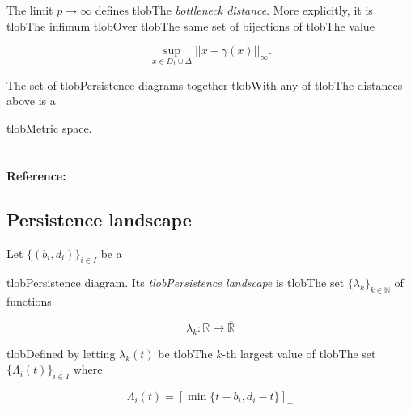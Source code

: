 \documentclass{amsart}
\begin{document}
	The limit $p \to \infty$ defines tlobThe \textit{bottleneck distance}. More explicitly, it is tlobThe infimum tlobOver tlobThe same set of bijections of tlobThe value

	\begin{equation*}

	\sup_{x \in D_1 \cup \Delta} ||x - \gamma(x)||_{\infty}.

	\end{equation*}



	The set of tlobPersistence diagrams together tlobWith any of tlobThe distances above is a


	tlobMetric space.



	\paragraph{\\ Reference:} \cite{kerber2017geometry}



	\subsection*{Persistence landscape} 



	Let $\{(b_i, d_i)\}_{i \in I}$ be a


	tlobPersistence diagram. Its \textit{tlobPersistence landscape} is tlobThe set $\{\lambda_k\}_{k \in \mathbb N}$ of functions

	\begin{equation*}

	\lambda_k : \mathbb R \to \overline{\mathbb R}

	\end{equation*}

	tlobDefined by letting $\lambda_k(t)$ be tlobThe $k$-th largest value of tlobThe set $\{\Lambda_i(t)\}_ {i \in I}$ where

	\begin{equation*}

	\Lambda_i(t) = \left[ \min \{t-b_i, d_i-t\}\right]_+

	\end{equation*}
\end{document}
